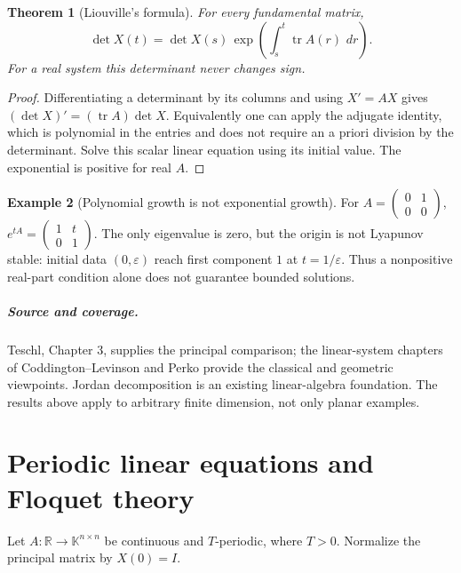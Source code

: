\documentclass[11pt,oneside]{book}
\newtheorem{theorem}{Theorem}[chapter]
\theoremstyle{definition}
\newtheorem{example}[theorem]{Example}
\theoremstyle{remark}\newtheorem{remark}[theorem]{Remark}
\newcommand{\R}{\mathbb R}\newcommand{\C}{\mathbb C}
\newcommand{\dd}{\,d}\newcommand{\id}{\operatorname{id}}
\begin{document}
\begin{theorem}[Liouville's formula]\label{d13:07:liouville}
For every fundamental matrix,
\[
 \det X(t)=\det X(s)\,
   \exp\left(\int_s^t\operatorname{tr} A(r)\,\dd r\right).
\]
For a real system this determinant never changes sign.
\end{theorem}
\begin{proof}
Differentiating a determinant by its columns and using \(X'=AX\) gives
\((\det X)'=(\operatorname{tr}A)\det X\). Equivalently one can apply the
adjugate identity, which is polynomial in the entries and does not require
an a priori division by the determinant. Solve this scalar linear equation
using its initial value. The exponential is positive for real \(A\).
\end{proof}

\begin{example}[Polynomial growth is not exponential growth]\label{d13:07:nilpotent-example}
For \(A=\left(\begin{smallmatrix}0&1\\0&0\end{smallmatrix}\right)\),
\(e^{tA}=\left(\begin{smallmatrix}1&t\\0&1\end{smallmatrix}\right)\).
The only eigenvalue is zero, but the origin is not Lyapunov stable:
initial data \((0,\varepsilon)\) reach first component \(1\) at
\(t=1/\varepsilon\). Thus a nonpositive real-part condition alone does not
guarantee bounded solutions.
\end{example}

\paragraph{Source and coverage.}
Teschl, Chapter 3, supplies the principal comparison; the linear-system
chapters of Coddington--Levinson and Perko provide the classical and geometric
viewpoints. Jordan decomposition is an existing linear-algebra foundation.
The results above apply to arbitrary finite dimension, not only planar
examples.



\chapter{Periodic linear equations and Floquet theory}\label{ch:d13-08}

Let \(A:\R\to\mathbb K^{n\times n}\) be continuous and \(T\)-periodic,
where \(T>0\). Normalize the principal matrix by \(X(0)=I\).
\end{document}
